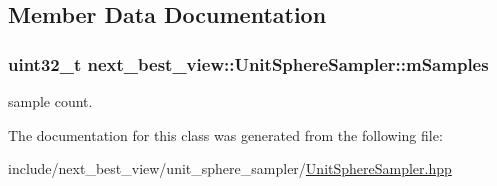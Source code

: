 \subsection{\-Member \-Data \-Documentation}
\hypertarget{classnext__best__view_1_1UnitSphereSampler_a926d76c0fcf55cef95f506d82ef92e9b}{
\subsubsection[{m\-Samples}]{\setlength{\rightskip}{0pt plus 5cm}uint32\-\_\-t {\bf next\-\_\-best\-\_\-view\-::\-Unit\-Sphere\-Sampler\-::m\-Samples}}}\label{classnext__best__view_1_1UnitSphereSampler_a926d76c0fcf55cef95f506d82ef92e9b}


sample count. 



\-The documentation for this class was generated from the following file\-:\begin{DoxyCompactItemize}
\item 
include/next\-\_\-best\-\_\-view/unit\-\_\-sphere\-\_\-sampler/\hyperlink{UnitSphereSampler_8hpp}{\-Unit\-Sphere\-Sampler.\-hpp}\end{DoxyCompactItemize}
